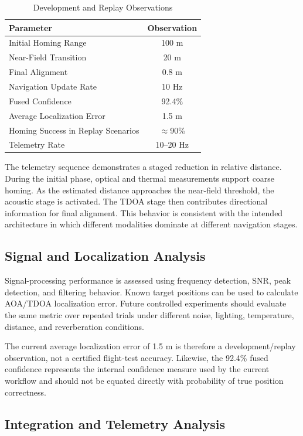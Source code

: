 \documentclass[conference]{IEEEtran}
\begin{document}
\begin{table}[H]
\centering
\caption{Development and Replay Observations}
\label{tab:results}
\small
\begin{tabular}{p{3.6cm}c}
\toprule
\textbf{Parameter} & \textbf{Observation} \\
\midrule
Initial Homing Range & 100 m \\
Near-Field Transition & 20 m \\
Final Alignment & 0.8 m \\
Navigation Update Rate & 10 Hz \\
Fused Confidence & 92.4\% \\
Average Localization Error & 1.5 m \\
Homing Success in Replay Scenarios & $\approx$90\% \\
Telemetry Rate & 10--20 Hz \\
\bottomrule
\end{tabular}
\end{table}

The telemetry sequence demonstrates a staged reduction in relative distance.
During the initial phase, optical and thermal measurements support coarse
homing. As the estimated distance approaches the near-field threshold, the
acoustic stage is activated. The TDOA stage then contributes directional
information for final alignment. This behavior is consistent with the intended
architecture in which different modalities dominate at different navigation
stages.

\subsection{Signal and Localization Analysis}

Signal-processing performance is assessed using frequency detection, SNR,
peak detection, and filtering behavior. Known target positions can be used to
calculate AOA/TDOA localization error. Future controlled experiments should
evaluate the same metric over repeated trials under different noise, lighting,
temperature, distance, and reverberation conditions.

The current average localization error of 1.5 m is therefore a
development/replay observation, not a certified flight-test accuracy.
Likewise, the 92.4\% fused confidence represents the internal confidence
measure used by the current workflow and should not be equated directly with
probability of true position correctness.

\subsection{Integration and Telemetry Analysis}
\end{document}
